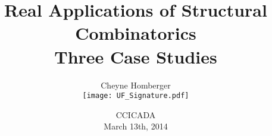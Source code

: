\documentclass[xcolor=table,dvipsnames]{beamer}
\begin{document}
\title[Patterns in Permutations]%
  {\large Real Applications of Structural Combinatorics\\
  \normalsize Three Case Studies}

\author{Cheyne Homberger  \\[6pt]
\texttt{[image: UF\_Signature.pdf]}}

\date{\small CCICADA \\ March 13th, 2014}


\begin{frame}
  \titlepage
\end{frame}

\begin{frame}
  \color{teal}{\large 
  Patterns in Data \\[1pc]
  Genome Rearrangement \\[1pc]
  Combinatorial Testing
  }
\end{frame}


  \begin{frame}
    \large \color{teal}{Relational Structures}
  \end{frame}
\end{document}
